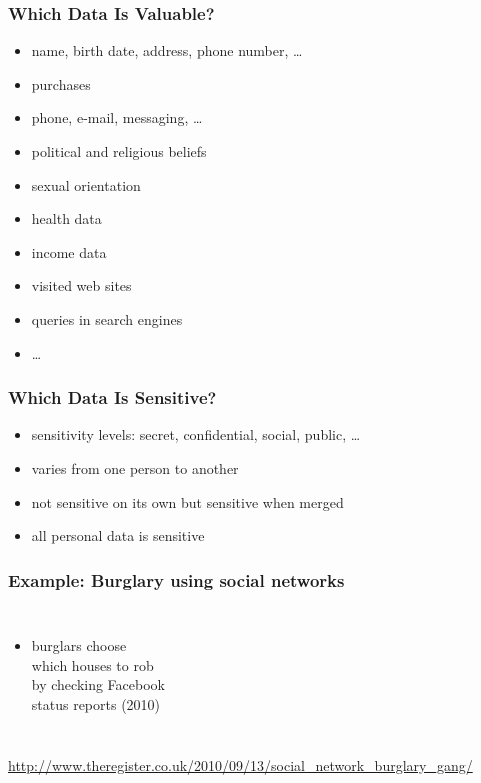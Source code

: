 \documentclass[dvipsnames]{beamer}
\theoremstyle{definition}
\theoremstyle{example}
\theoremstyle{plain}
\begin{document}
\begin{frame}
  \frametitle{Which Data Is Valuable?}

  \begin{itemize}
    \item name, birth date, address, phone number, \ldots
    \item purchases
    \item phone, e-mail, messaging, \ldots
    \item political and religious beliefs
    \item sexual orientation
    \item health data
    \item income data
    \item visited web sites
    \item queries in search engines
    \item \ldots
  \end{itemize}
\end{frame}

\begin{frame}
  \frametitle{Which Data Is Sensitive?}

  \begin{itemize}
    \item sensitivity levels: secret, confidential, social, public, \ldots
    \item varies from one person to another
    \item not sensitive on its own but sensitive when merged

    \bigskip
    \item all personal data is sensitive
  \end{itemize}
\end{frame}

\begin{frame}
  \frametitle{Example: Burglary using social networks}

  \begin{columns}

    \begin{itemize}
      \item burglars choose\\
        which houses to rob\\
        by checking Facebook\\
        status reports (2010)
    \end{itemize}
  \end{columns}

  \medskip
  \tiny{\url{http://www.theregister.co.uk/2010/09/13/social_network_burglary_gang/}}\\
\end{frame}
\end{document}
